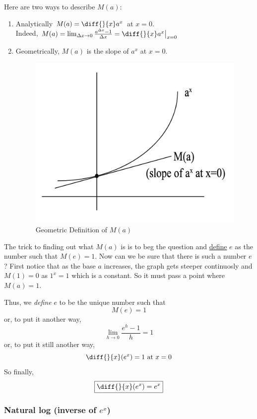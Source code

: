Here are two ways to describe $M(a)$:
\begin{enumerate}
	\item Analytically $M(a) = \diff{}{x} a^x$ at $x=0$. \\
	Indeed, $ M(a) = \lim_{\Delta x \to 0} \frac{a^{\Delta x} - 1}{\Delta x} = \diff{}{x} a^x \big|_{x=0} $
	\item Geometrically, $M(a)$ is the slope of $a^x$ at $x=0$. 

	\begin{figure}[ht!]
		\centering        
		\includegraphics[scale=0.4]{./images/lecture_6_figure_1.png}
		\caption{Geometric Definition of $M(a)$}
	\end{figure}
\end{enumerate}

The trick to finding out what $M(a)$ is is to beg the question and \underline{define} $e$ as the number such that $M(e) = 1$.
Now can we be sure that there is such a number $e$?
First notice that as the base $a$ increases, the graph gets steeper continuosly and $M(1) = 0$ as $1^x = 1$ which is a constant.
So it must pass a point where $M(a) = 1$.

Thus, we \textit{define} $e$ to be the unique number such that $$ M(e) = 1 $$
or, to put it another way, $$ \lim_{h \to 0} \frac{e^h - 1}{h} = 1 $$
or, to put it still another way, $$\diff{}{x} (e^x) = 1 \text{ at } x = 0 $$
So finally, $$\boxed{\diff{}{x}(e^x) = e^x}$$


\subsubsection{Natural log (inverse of $e^x$)}

